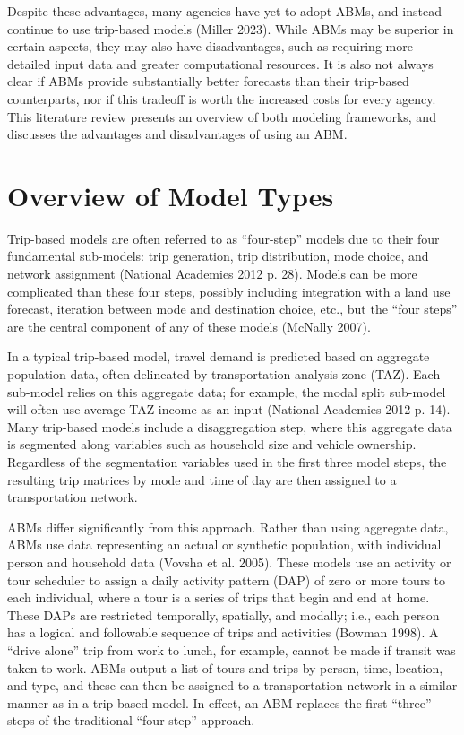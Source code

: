 \documentclass[fancy, twoside, mastersfancy, ms]{byuthesis}
\begin{document}
Despite these advantages, many agencies have yet to adopt ABMs, and
instead continue to use trip-based models (Miller 2023). While ABMs may
be superior in certain aspects, they may also have disadvantages, such
as requiring more detailed input data and greater computational
resources. It is also not always clear if ABMs provide substantially
better forecasts than their trip-based counterparts, nor if this
tradeoff is worth the increased costs for every agency. This literature
review presents an overview of both modeling frameworks, and discusses
the advantages and disadvantages of using an ABM.

\section{Overview of Model Types}\label{overview-of-model-types}

Trip-based models are often referred to as ``four-step'' models due to
their four fundamental sub-models: trip generation, trip distribution,
mode choice, and network assignment (National Academies 2012 p. 28).
Models can be more complicated than these four steps, possibly including
integration with a land use forecast, iteration between mode and
destination choice, etc., but the ``four steps'' are the central
component of any of these models (McNally 2007).

In a typical trip-based model, travel demand is predicted based on
aggregate population data, often delineated by transportation analysis
zone (TAZ). Each sub-model relies on this aggregate data; for example,
the modal split sub-model will often use average TAZ income as an input
(National Academies 2012 p. 14). Many trip-based models include a
disaggregation step, where this aggregate data is segmented along
variables such as household size and vehicle ownership. Regardless of
the segmentation variables used in the first three model steps, the
resulting trip matrices by mode and time of day are then assigned to a
transportation network.

ABMs differ significantly from this approach. Rather than using
aggregate data, ABMs use data representing an actual or synthetic
population, with individual person and household data (Vovsha et al.
2005). These models use an activity or tour scheduler to assign a daily
activity pattern (DAP) of zero or more tours to each individual, where a
tour is a series of trips that begin and end at home. These DAPs are
restricted temporally, spatially, and modally; i.e., each person has a
logical and followable sequence of trips and activities (Bowman 1998). A
``drive alone'' trip from work to lunch, for example, cannot be made if
transit was taken to work. ABMs output a list of tours and trips by
person, time, location, and type, and these can then be assigned to a
transportation network in a similar manner as in a trip-based model. In
effect, an ABM replaces the first ``three'' steps of the traditional
``four-step'' approach.
\end{document}
